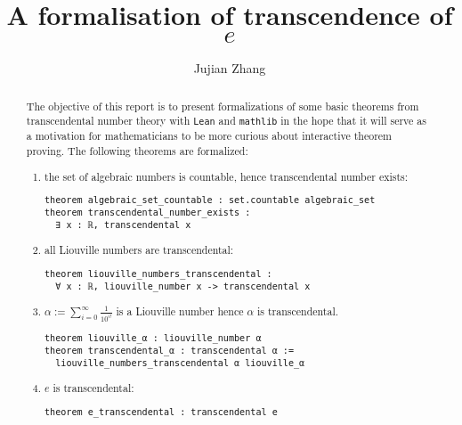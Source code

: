\documentclass{report}
\title{A formalisation of transcendence of $e$}
\author{Jujian Zhang}
\theoremstyle{definition}
\theoremstyle{plain}
\begin{document}
\maketitle

\begin{abstract}
The objective of this report is to present formalizations of some basic theorems from transcendental number theory with {\tt \small Lean} and {\tt \small mathlib} in the hope that it will serve as a motivation for mathematicians to be more curious about interactive theorem proving. The following theorems are formalized:
\begin{enumerate}
  \item the set of algebraic numbers is countable, hence transcendental number exists:

\begin{verbatim}
theorem algebraic_set_countable : set.countable algebraic_set
theorem transcendental_number_exists : 
  ∃ x : ℝ, transcendental x
\end{verbatim}

  \item all Liouville numbers are transcendental:
\begin{verbatim}
theorem liouville_numbers_transcendental : 
  ∀ x : ℝ, liouville_number x -> transcendental x
\end{verbatim}

  \item $\alpha := \sum_{i=0}^\infty\frac1{10^{i!}}$ is a Liouville number hence $\alpha$ is transcendental.

\begin{verbatim}
theorem liouville_α : liouville_number α
theorem transcendental_α : transcendental α := 
  liouville_numbers_transcendental α liouville_α
\end{verbatim}

  \item $e$ is transcendental:
\begin{verbatim}
theorem e_transcendental : transcendental e
\end{verbatim}
\end{enumerate}
\end{abstract}
\end{document}
